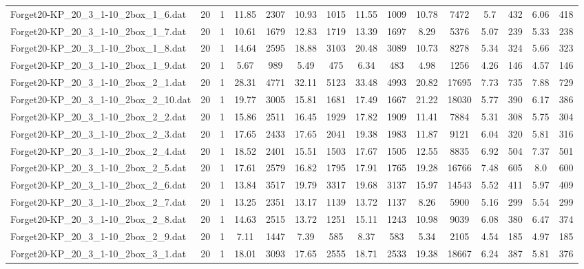 \begin{table}[!ht]
{\begin{tabular}{lcccccccccccccc}
Forget20-KP\_20\_3\_1-10\_2box\_1\_6.dat & 20 & 1 & 11.85 & 2307 & 10.93 & 1015 & 11.55 & 1009 & 10.78 & 7472 & 5.7 & 432 & 6.06 & 418 \\
Forget20-KP\_20\_3\_1-10\_2box\_1\_7.dat & 20 & 1 & 10.61 & 1679 & 12.83 & 1719 & 13.39 & 1697 & 8.29 & 5376 & 5.07 & 239 & 5.33 & 238 \\
Forget20-KP\_20\_3\_1-10\_2box\_1\_8.dat & 20 & 1 & 14.64 & 2595 & 18.88 & 3103 & 20.48 & 3089 & 10.73 & 8278 & 5.34 & 324 & 5.66 & 323 \\
Forget20-KP\_20\_3\_1-10\_2box\_1\_9.dat & 20 & 1 & 5.67 & 989 & 5.49 & 475 & 6.34 & 483 & 4.98 & 1256 & 4.26 & 146 & 4.57 & 146 \\
Forget20-KP\_20\_3\_1-10\_2box\_2\_1.dat & 20 & 1 & 28.31 & 4771 & 32.11 & 5123 & 33.48 & 4993 & 20.82 & 17695 & 7.73 & 735 & 7.88 & 729 \\
Forget20-KP\_20\_3\_1-10\_2box\_2\_10.dat & 20 & 1 & 19.77 & 3005 & 15.81 & 1681 & 17.49 & 1667 & 21.22 & 18030 & 5.77 & 390 & 6.17 & 386 \\
Forget20-KP\_20\_3\_1-10\_2box\_2\_2.dat & 20 & 1 & 15.86 & 2511 & 16.45 & 1929 & 17.82 & 1909 & 11.41 & 7884 & 5.31 & 308 & 5.75 & 304 \\
Forget20-KP\_20\_3\_1-10\_2box\_2\_3.dat & 20 & 1 & 17.65 & 2433 & 17.65 & 2041 & 19.38 & 1983 & 11.87 & 9121 & 6.04 & 320 & 5.81 & 316 \\
Forget20-KP\_20\_3\_1-10\_2box\_2\_4.dat & 20 & 1 & 18.52 & 2401 & 15.51 & 1503 & 17.67 & 1505 & 12.55 & 8835 & 6.92 & 504 & 7.37 & 501 \\
Forget20-KP\_20\_3\_1-10\_2box\_2\_5.dat & 20 & 1 & 17.61 & 2579 & 16.82 & 1795 & 17.91 & 1765 & 19.28 & 16766 & 7.48 & 605 & 8.0 & 600 \\
Forget20-KP\_20\_3\_1-10\_2box\_2\_6.dat & 20 & 1 & 13.84 & 3517 & 19.79 & 3317 & 19.68 & 3137 & 15.97 & 14543 & 5.52 & 411 & 5.97 & 409 \\
Forget20-KP\_20\_3\_1-10\_2box\_2\_7.dat & 20 & 1 & 13.25 & 2351 & 13.17 & 1139 & 13.72 & 1137 & 8.26 & 5900 & 5.16 & 299 & 5.54 & 299 \\
Forget20-KP\_20\_3\_1-10\_2box\_2\_8.dat & 20 & 1 & 14.63 & 2515 & 13.72 & 1251 & 15.11 & 1243 & 10.98 & 9039 & 6.08 & 380 & 6.47 & 374 \\
Forget20-KP\_20\_3\_1-10\_2box\_2\_9.dat & 20 & 1 & 7.11 & 1447 & 7.39 & 585 & 8.37 & 583 & 5.34 & 2105 & 4.54 & 185 & 4.97 & 185 \\
Forget20-KP\_20\_3\_1-10\_2box\_3\_1.dat & 20 & 1 & 18.01 & 3093 & 17.65 & 2555 & 18.71 & 2533 & 19.38 & 18667 & 6.24 & 387 & 5.81 & 376 \\

\end{tabular}}
\end{table}

